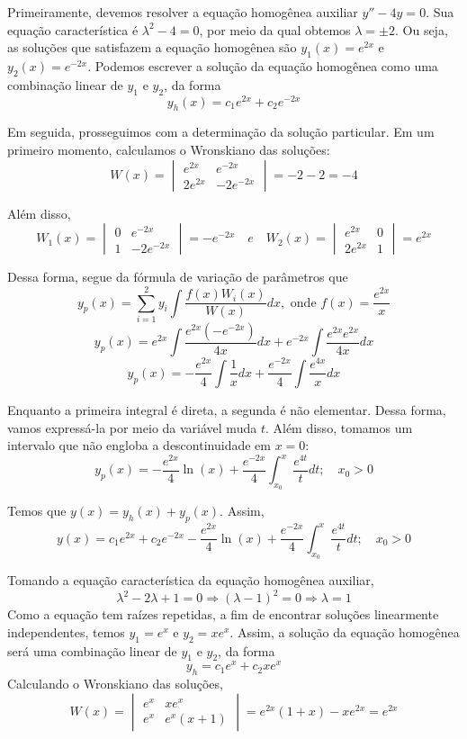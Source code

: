 \documentclass[oneside,12pt,a4paper]{report}
\begin{document}
\begin{resolucao}
    \itemresolucao Primeiramente, devemos resolver a equação homogênea auxiliar $y''-4y=0$. Sua equação característica é $\lambda^2-4=0$, por meio da qual obtemos $\lambda=\pm2$. Ou seja, as soluções que satisfazem a equação homogênea são $y_1(x) = e^{2x}$ e $y_2(x) = e^{-2x}$. Podemos escrever a solução da equação homogênea como uma combinação linear de $y_1$ e $y_2$, da forma
    \[y_h(x)=c_1e^{2x}+c_2e^{-2x}\]

    Em seguida, prosseguimos com a determinação da solução particular. Em um primeiro momento, calculamos o Wronskiano das soluções:
    \[W(x)=\begin{vmatrix}
        e^{2x} & e^{-2x}\\
        2e^{2x} & -2e^{-2x}
    \end{vmatrix}=-2-2=-4\]

    Além disso,
    \[W_1(x)=\begin{vmatrix}
        0 & e^{-2x}\\
        1 & -2e^{-2x}
    \end{vmatrix}=-e^{-2x}\quad e \quad W_2(x)=\begin{vmatrix}
        e^{2x}  & 0\\
        2e^{2x} & 1
    \end{vmatrix}=e^{2x}\]

    Dessa forma, segue da fórmula de variação de parâmetros que
    \[y_p(x)=\sum_{i=1}^{2}y_i\int\frac{f(x)W_i(x)}{W(x)}dx, \text{ onde } f(x)=\frac{e^{2x}}{x}\]
    \[y_p(x)=e^{2x}\int\frac{e^{2x}(-e^{-2x})}{4x}dx+e^{-2x}\int\frac{e^{2x}e^{2x}}{4x}dx\]
    \[y_p(x)=-\frac{e^{2x}}{4}\int\frac{1}{x}dx+\frac{e^{-2x}}{4}\int\frac{e^{4x}}{x}dx\]

    Enquanto a primeira integral é direta, a segunda é não elementar. Dessa forma, vamos expressá-la por meio da variável muda $t$. Além disso, tomamos um intervalo que não engloba a descontinuidade em $x=0$:
    \[y_p(x)=-\frac{e^{2x}}{4}\ln(x)+\frac{e^{-2x}}{4}\int_{x_0}^{x}\frac{e^{4t}}{t}dt;\quad x_0>0\]

    Temos que $y(x)=y_h(x)+y_p(x)$. Assim,
    \[\boxed{y(x)=c_1e^{2x}+c_2e^{-2x}-\frac{e^{2x}}{4}\ln(x)+\frac{e^{-2x}}{4}\int_{x_0}^{x}\frac{e^{4t}}{t}dt;\quad x_0>0}\]

    \itemresolucao Tomando a equação característica da equação homogênea auxiliar, 
    \[\lambda^2-2\lambda+1=0\Rightarrow(\lambda-1)^2=0\Rightarrow\lambda=1\]
    Como a equação tem raízes repetidas, a fim de encontrar soluções linearmente independentes, temos $y_1=e^x$ e $y_2=xe^x$. Assim, a solução da equação homogênea será uma combinação linear de $y_1$ e $y_2$, da forma
    \[y_h=c_1e^x+c_2xe^x\]
    Calculando o Wronskiano das soluções,
    \[W(x)=\begin{vmatrix}
        e^{x} & xe^{x}\\
        e^{x} & e^{x}(x+1)
    \end{vmatrix}=e^{2x}(1+x)-xe^{2x}=e^{2x}\]


\end{resolucao}
\end{document}

